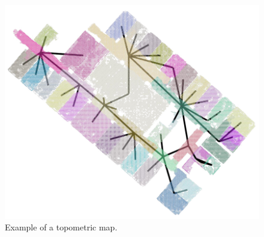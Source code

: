 \begin{figure}[h]
    \centering
    \includegraphics*[width=.8\textwidth]{./fig/area_1_topo_01.png}
    \caption{Example of a topometric map.}
    \label{fig:topometricmap}
\end{figure}


